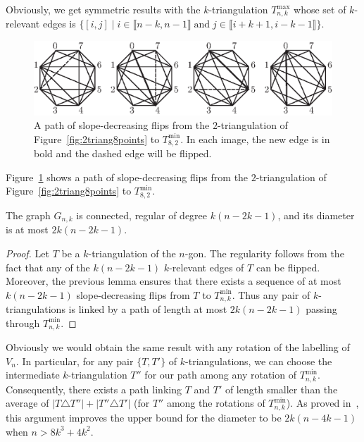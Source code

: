 \documentclass[12pt]{amsart}
\begin{document}
Obviously, we get symmetric results with the $k$-triangulation $T_{n,k}^{\max}$ whose set of $k$-relevant edges is $\{[i,j]\;|\;i\in\llbracket n-k,n-1\rrbracket\;\mathrm{and}\;j\in\llbracket i+k+1,i-k-1\rrbracket\}$.

\begin{figure}
\centerline{\includegraphics[scale=1]{2triang8pointsflip.eps}}
\caption{\small{A path of slope-decreasing flips from the $2$-triangulation of Figure~\ref{fig:2triang8points} to $T_{8,2}^{\min}$. In each image, the new edge is in bold and the dashed edge will be flipped.}}\label{fig:2triang8pointsflip}
\end{figure}

\begin{example}
\rm
Figure~\ref{fig:2triang8pointsflip} shows a path of slope-decreasing flips from the $2$-triangulation of Figure~\ref{fig:2triang8points} to $T_{8,2}^{\min}$.
\end{example}

\begin{corollary}\label{graphflips}
The graph $G_{n,k}$ is connected, regular of degree $k(n-2k-1)$, and its diameter is at most $2k(n-2k-1)$.
\end{corollary}

\begin{proof}
Let $T$ be a $k$-triangulation of the $n$-gon. The regularity follows from the fact that any of the $k(n-2k-1)$ $k$-relevant edges of $T$ can be flipped. Moreover, the previous lemma ensures that there exists a sequence of at most $k(n-2k-1)$ slope-decreasing flips from $T$ to $T_{n,k}^{\min}$. Thus any pair of $k$-triangulations is linked by a path of length at most $2k(n-2k-1)$ passing through $T_{n,k}^{\min}$.
\end{proof}

Obviously we would obtain the same result with any rotation of the labelling of $V_n$. In particular, for any pair $\{T,T'\}$ of $k$-triangulations, we can choose the intermediate $k$-triangulation $T''$ for our path among any rotation of $T_{n,k}^{\min}$. Consequently, there exists a path linking $T$ and $T'$ of length smaller than the average of $|T\triangle T''|+|T''\triangle T'|$ (for $T''$ among the rotations of $T_{n,k}^{\min}$). As proved in~\cite{n-gdfcp-00}, this argument improves the upper bound for 
the diameter  to be $2k(n-4k-1)$ when $n>8k^3+4k^2$.
\end{document}
